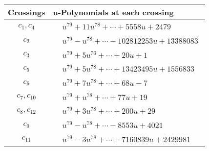 \documentclass[1p]{elsarticle_modified}
\theoremstyle{definition}
\begin{document}
\begin{tabular}{m{50pt}|m{274pt}}
Crossings & \hspace{64pt}u-Polynomials at each crossing \\
\hline $$\begin{aligned}c_{1},c_{4}\end{aligned}$$&$\begin{aligned}
&u^{79}+11 u^{78}+\cdots+5558 u+2479
\end{aligned}$\\
\hline $$\begin{aligned}c_{2}\end{aligned}$$&$\begin{aligned}
&u^{79}- u^{78}+\cdots-102812253 u+13388083
\end{aligned}$\\
\hline $$\begin{aligned}c_{3}\end{aligned}$$&$\begin{aligned}
&u^{79}+5 u^{76}+\cdots+20 u+1
\end{aligned}$\\
\hline $$\begin{aligned}c_{5}\end{aligned}$$&$\begin{aligned}
&u^{79}+5 u^{78}+\cdots+13423495 u+1556833
\end{aligned}$\\
\hline $$\begin{aligned}c_{6}\end{aligned}$$&$\begin{aligned}
&u^{79}+7 u^{78}+\cdots+68 u-7
\end{aligned}$\\
\hline $$\begin{aligned}c_{7},c_{10}\end{aligned}$$&$\begin{aligned}
&u^{79}+u^{78}+\cdots+77 u+19
\end{aligned}$\\
\hline $$\begin{aligned}c_{8},c_{12}\end{aligned}$$&$\begin{aligned}
&u^{79}+3 u^{78}+\cdots+200 u+29
\end{aligned}$\\
\hline $$\begin{aligned}c_{9}\end{aligned}$$&$\begin{aligned}
&u^{79}- u^{78}+\cdots-8553 u+4021
\end{aligned}$\\
\hline $$\begin{aligned}c_{11}\end{aligned}$$&$\begin{aligned}
&u^{79}-3 u^{78}+\cdots+7160839 u+2429981
\end{aligned}$\\
\hline
\end{tabular}\\~\\
\end{document}
